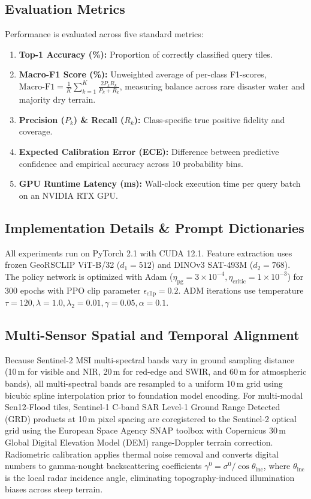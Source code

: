 \subsection{Evaluation Metrics}
Performance is evaluated across five standard metrics:
\begin{enumerate}
    \item \textbf{Top-1 Accuracy (\%):} Proportion of correctly classified query tiles.
    \item \textbf{Macro-F1 Score (\%):} Unweighted average of per-class F1-scores, $\mathrm{Macro\text{-}F1} = \frac{1}{K}\sum_{k=1}^K \frac{2 P_k R_k}{P_k + R_k}$, measuring balance across rare disaster water and majority dry terrain.
    \item \textbf{Precision ($P_k$) \& Recall ($R_k$):} Class-specific true positive fidelity and coverage.
    \item \textbf{Expected Calibration Error (ECE):} Difference between predictive confidence and empirical accuracy across 10 probability bins.
    \item \textbf{GPU Runtime Latency (ms):} Wall-clock execution time per query batch on an NVIDIA RTX GPU.
\end{enumerate}

\subsection{Implementation Details \& Prompt Dictionaries}
All experiments run on PyTorch 2.1 with CUDA 12.1. Feature extraction uses frozen GeoRSCLIP ViT-B/32 ($d_1=512$) and DINOv3 SAT-493M ($d_2=768$). The policy network is optimized with Adam ($\eta_{\text{pg}}=3 \times 10^{-4}, \eta_{\text{critic}}=1 \times 10^{-3}$) for 300 epochs with PPO clip parameter $\epsilon_{\text{clip}}=0.2$. ADM iterations use temperature $\tau=120, \lambda=1.0, \lambda_2=0.01, \gamma=0.05, \alpha=0.1$.

\subsection{Multi-Sensor Spatial and Temporal Alignment}
Because Sentinel-2 MSI multi-spectral bands vary in ground sampling distance (10\,m for visible and NIR, 20\,m for red-edge and SWIR, and 60\,m for atmospheric bands), all multi-spectral bands are resampled to a uniform 10\,m grid using bicubic spline interpolation prior to foundation model encoding. For multi-modal Sen12-Flood tiles, Sentinel-1 C-band SAR Level-1 Ground Range Detected (GRD) products at 10\,m pixel spacing are coregistered to the Sentinel-2 optical grid using the European Space Agency SNAP toolbox with Copernicus 30\,m Global Digital Elevation Model (DEM) range-Doppler terrain correction. Radiometric calibration applies thermal noise removal and converts digital numbers to gamma-nought backscattering coefficients $\gamma^0 = \sigma^0 / \cos\theta_{\text{inc}}$, where $\theta_{\text{inc}}$ is the local radar incidence angle, eliminating topography-induced illumination biases across steep terrain.

